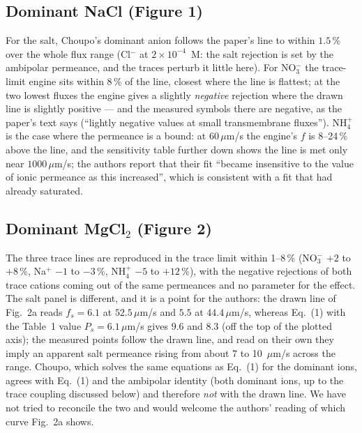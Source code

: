 \subsection*{Dominant NaCl (Figure 1)}



For the salt, Choupo's dominant anion follows the paper's line to within
$1.5\,\%$ over the whole flux range (Cl$^-$ at $2\times10^{-4}$~M: the salt
rejection is set by the ambipolar permeance, and the traces perturb it
little here).  For NO$_3^-$ the trace-limit engine sits within $8\,\%$ of
the line, closest where the line is flattest; at the two lowest fluxes the
engine gives a slightly \emph{negative} rejection where the drawn line is
slightly positive --- and the measured symbols there are negative, as the
paper's text says (``lightly negative values at small transmembrane
fluxes'').  NH$_4^+$ is the case where the permeance is a bound: at
$60\,\mu$m/s the engine's $f$ is 8--24\,\% above the line, and the
sensitivity table further down shows the line is met only near
$1000\,\mu$m/s; the authors report that their fit ``became insensitive to the
value of ionic permeance as this increased'', which is consistent with a
fit that had already saturated.

\subsection*{Dominant MgCl$_2$ (Figure 2)}



The three trace lines are reproduced in the trace limit within 1--8\,\%
(NO$_3^-$ $+2$ to $+8\,\%$, Na$^+$ $-1$ to $-3\,\%$, NH$_4^+$ $-5$ to
$+12\,\%$), with the negative rejections of both trace cations coming out
of the same permeances and no parameter for the effect.  The salt panel is
different, and it is a point for the authors: the drawn line of Fig.~2a
reads $f_s = 6.1$ at $52.5\,\mu$m/s and $5.5$ at $44.4\,\mu$m/s, whereas
Eq.~(1) with the Table~1 value $P_s = 6.1\,\mu$m/s gives $9.6$ and $8.3$
(off the top of the plotted axis); the measured points follow the drawn
line, and read on their own they imply an apparent salt permeance rising
from about 7 to 10~$\mu$m/s across the range.  Choupo, which solves the
same equations as Eq.~(1) for the dominant ions, agrees with Eq.~(1) and
the ambipolar identity (both dominant ions, up to the trace coupling
discussed below) and therefore \emph{not} with the drawn line.  We have
not tried to reconcile the two and would welcome the authors' reading of
which curve Fig.~2a shows.

